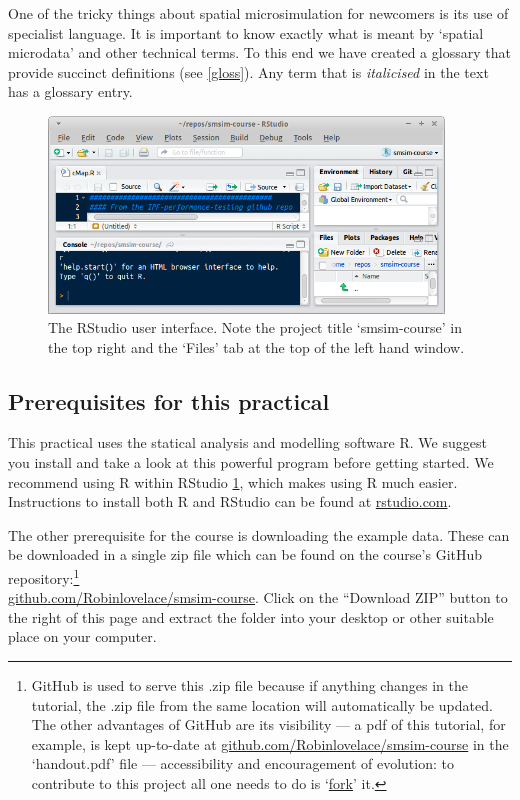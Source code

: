 \documentclass[a4paper, 11pt, twoside]{article}
\begin{document}
One of the tricky things about spatial microsimulation for newcomers is its use
of specialist language. It is important to know exactly what is meant by
`spatial microdata' and other technical terms. To this end we have created a
glossary that provide succinct definitions (see \cref{gloss}). Any term that is
\emph{italicised} in the text has a glossary entry.

\begin{figure}
\begin{center}
   \includegraphics[width=10.5cm]{rstudio}
\end{center}
 \caption{The RStudio user interface. Note the project title `smsim-course' in
the top right and the `Files' tab at the top of the left hand window.}
\label{frstudio}
\end{figure}

\subsection{Prerequisites for this practical}

This practical uses the statical analysis and modelling software
R. We suggest you install and take a look at this powerful program
before getting started. We recommend using R within RStudio \cref{frstudio}, which makes
using R much easier. Instructions to install both R and RStudio can be found
at \href{http://www.rstudio.com/ide/download/desktop}{rstudio.com}.

The other prerequisite for the course is downloading the example data.
These can be downloaded in a single zip file which can be found on the
course's GitHub repository:\footnote{GitHub
is used to serve this .zip file because if anything changes
in the tutorial, the .zip file from the same location will
automatically be updated. The other advantages of GitHub are its
visibility --- a pdf of this tutorial, for example,
is kept up-to-date at 
\href{https://github.com/Robinlovelace/smsim-course/blob/master/handout.pdf}{github.com/Robinlovelace/smsim-course}
in the `handout.pdf' file --- accessibility and encouragement of evolution: to contribute
to this project all one needs to do is
`\href{https://help.github.com/articles/fork-a-repo}{fork}' it.
} \\
\href{https://github.com/Robinlovelace/smsim-course}{github.com/Robinlovelace/smsim-course}.
Click on the ``Download ZIP'' button to the right of this page and extract
the folder into your desktop or other suitable place on your computer.
\end{document}
